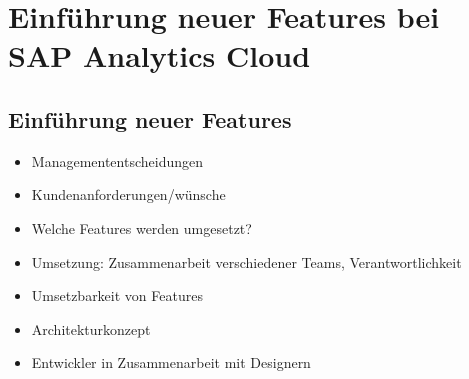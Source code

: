 \section{Einführung neuer Features bei SAP Analytics Cloud}\label{sec:kaptiel}

\subsection{Einführung neuer Features}
\begin{itemize}
    \item Managemententscheidungen
    \item Kundenanforderungen/wünsche
    \item Welche Features werden umgesetzt?
    \item Umsetzung: Zusammenarbeit verschiedener Teams, Verantwortlichkeit
    \item Umsetzbarkeit von Features
    \item Architekturkonzept
    \item Entwickler in Zusammenarbeit mit Designern
\end{itemize}
